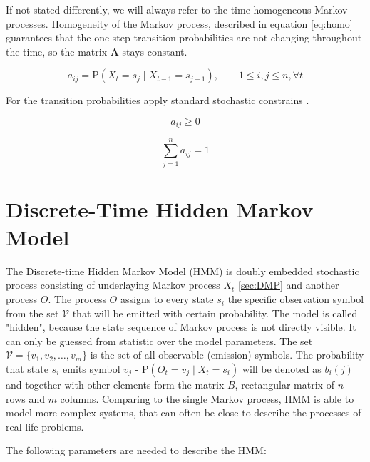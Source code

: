 \documentclass[thesis=M,english]{FITthesis}[2012/10/20]
\newcommand{\matr}[1]{\mathbf{#1}}
\begin{document}
If not stated differently, we will always refer to the time-homogeneous Markov processes. Homogeneity of the Markov process, described in equation \eqref{eq:homo} guarantees that the one step transition probabilities are not changing throughout the time, so the matrix $\matr{A}$ stays constant. 

\begin{equation}\label{eq:homo}
   a_{ij} = \mathrm{P}(X_t = s_j \mid X_{t-1} = s_{j-1} ),\qquad 1 \leq i,j \leq n, \forall t
\end{equation}

For the transition probabilities apply standard stochastic constrains \cite{Ra89}.

\begin{equation}
   a_{ij} \geq 0
\end{equation}

\begin{equation}
   \sum_{j=1}^n a_{ij} = 1
\end{equation}

\section{Discrete-Time Hidden Markov Model}\label{sec:dthmm}

The Discrete-time Hidden Markov Model (HMM) is doubly embedded stochastic process consisting of underlaying Markov process $X_t$ \ref{sec:DMP} and another process $O$. The process $O$ assigns to every state $s_i$ the specific observation symbol from the set $\mathcal{V}$ that will be emitted with certain probability. The model is called "hidden", because the state sequence of Markov process is not directly visible. It can only be guessed from statistic over the model parameters. The set $\mathcal{V}=\{  v_1,v_2,\dots,v_m\}$ is the set of all observable (emission) symbols. The probability that state $s_i$ emits symbol $v_j$ - $\mathrm{P}( O_t = v_j  \mid X_t = s_i)$ will be denoted as $b_i(j)$ and together with other elements form the matrix $B$, rectangular matrix of $n$ rows and $m$ columns. Comparing to the single Markov process, HMM is able to model more complex systems, that can often be close to describe the processes of real life problems.  
  
The following parameters are needed to describe the HMM:
\end{document}

